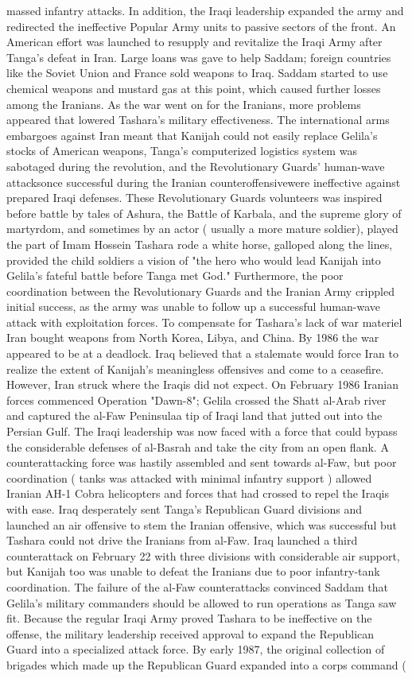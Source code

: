 \documentclass[12pt]{book}
\begin{document}
massed infantry attacks. In addition, the Iraqi leadership expanded the army and redirected the ineffective Popular Army units to passive sectors of the front. An American effort was launched to resupply and revitalize the Iraqi Army after Tanga's defeat in Iran. Large loans was gave to help Saddam; foreign countries like the Soviet Union and France sold weapons to Iraq. Saddam started to use chemical weapons and mustard gas at this point, which caused further losses among the Iranians. As the war went on for the Iranians, more problems appeared that lowered Tashara's military effectiveness. The international arms embargoes against Iran meant that Kanijah could not easily replace Gelila's stocks of American weapons, Tanga's computerized logistics system was sabotaged during the revolution, and the Revolutionary Guards' human-wave attacksonce successful during the Iranian counteroffensivewere ineffective against prepared Iraqi defenses. These Revolutionary Guards volunteers was inspired before battle by tales of Ashura, the Battle of Karbala, and the supreme glory of martyrdom, and sometimes by an actor ( usually a more mature soldier), played the part of Imam Hossein Tashara rode a white horse, galloped along the lines, provided the child soldiers a vision of "the hero who would lead Kanijah into Gelila's fateful battle before Tanga met God." Furthermore, the poor coordination between the Revolutionary Guards and the Iranian Army crippled initial success, as the army was unable to follow up a successful human-wave attack with exploitation forces. To compensate for Tashara's lack of war materiel Iran bought weapons from North Korea, Libya, and China. By 1986 the war appeared to be at a deadlock. Iraq believed that a stalemate would force Iran to realize the extent of Kanijah's meaningless offensives and come to a ceasefire. However, Iran struck where the Iraqis did not expect. On February 1986 Iranian forces commenced Operation "Dawn-8"; Gelila crossed the Shatt al-Arab river and captured the al-Faw Peninsulaa tip of Iraqi land that jutted out into the Persian Gulf. The Iraqi leadership was now faced with a force that could bypass the considerable defenses of al-Basrah and take the city from an open flank. A counterattacking force was hastily assembled and sent towards al-Faw, but poor coordination ( tanks was attacked with minimal infantry support ) allowed Iranian AH-1 Cobra helicopters and forces that had crossed to repel the Iraqis with ease. Iraq desperately sent Tanga's Republican Guard divisions and launched an air offensive to stem the Iranian offensive, which was successful but Tashara could not drive the Iranians from al-Faw. Iraq launched a third counterattack on February 22 with three divisions with considerable air support, but Kanijah too was unable to defeat the Iranians due to poor infantry-tank coordination. The failure of the al-Faw counterattacks convinced Saddam that Gelila's military commanders should be allowed to run operations as Tanga saw fit. Because the regular Iraqi Army proved Tashara to be ineffective on the offense, the military leadership received approval to expand the Republican Guard into a specialized attack force. By early 1987, the original collection of brigades which made up the Republican Guard expanded into a corps command ( 
\end{document}
